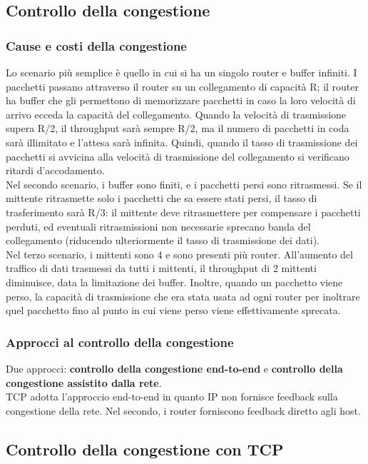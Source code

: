 \documentclass[11pt]{article}
\begin{document}
\subsection{Controllo della congestione}
\subsubsection{Cause e costi della congestione}
Lo scenario più semplice è quello in cui si ha un singolo router e buffer infiniti. I pacchetti passano attraverso il router 
su un collegamento di capacità R; il router ha buffer che gli permettono di memorizzare pacchetti in caso la loro velocità 
di arrivo ecceda la capacità del collegamento. Quando la velocità di trasmissione supera R/2, il throughput sarà sempre 
R/2, ma il numero di pacchetti in coda sarà illimitato e l'attesa sarà infinita. Quindi, quando il tasso di trasmissione 
dei pacchetti si avvicina alla velocità di trasmissione del collegamento si verificano ritardi d'accodamento.\\
Nel secondo scenario, i buffer sono finiti, e i pacchetti persi sono ritrasmessi. Se il mittente ritrasmette solo i pacchetti 
che sa essere stati persi, il tasso di trasferimento sarà R/3: il mittente deve ritrasmettere per compensare i pacchetti 
perduti, ed eventuali ritrasmissioni non necessarie sprecano banda del collegamento (riducendo ulteriormente il tasso di 
trasmissione dei dati).\\
Nel terzo scenario, i mittenti sono 4 e sono presenti più router. All'aumento del traffico di dati trasmessi da tutti i 
mittenti, il throughput di 2 mittenti diminuisce, data la limitazione dei buffer. Inoltre, quando un pacchetto viene perso,
la capacità di trasmissione che era stata usata ad ogni router per inoltrare quel pacchetto fino al punto in cui viene 
perso viene effettivamente sprecata.
\subsubsection{Approcci al controllo della congestione}
Due approcci: \textbf{controllo della congestione end-to-end} e \textbf{controllo della congestione assistito dalla rete}.\\
TCP adotta l'approccio end-to-end in quanto IP non fornisce feedback sulla congestione della rete. Nel secondo, i router 
forniscono feedback diretto agli host.
\subsection{Controllo della congestione con TCP}
\end{document}
